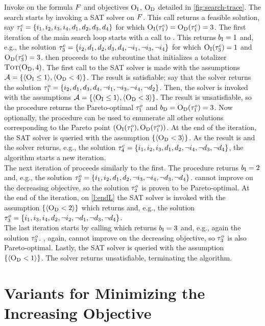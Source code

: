 \begin{example}\label{ex:main-iteration}
  Invoke \algname{} on the formula $F$ and objectives $\textsc{O}_{\text{I}}$, $\textsc{O}_{\text{D}}$ detailed in \cref{fig:search-trace}. 
  The search starts by invoking a SAT solver on $F$.
  This call returns a feasible solution, say $\tau^c_1 = \{i_1,\allowbreak i_2,\allowbreak i_3,\allowbreak i_4,\allowbreak d_1,\allowbreak d_2,\allowbreak d_3,\allowbreak d_4\}$ for which $\textsc{O}_{\text{I}}(\tau^c_1) = \textsc{O}_{\text{D}}(\tau^c_1) = 3$. 
  The first iteration of the main search loop starts with a call to \Min{}.
  This returns $b_{\text{I}} = 1$ and, e.g., the solution $\tau^c_3 = \{i_2,\allowbreak d_1,\allowbreak d_2,\allowbreak d_3,\allowbreak d_4,\allowbreak \lnot i_1,\allowbreak \lnot i_3,\allowbreak \lnot i_4\}$ for which $\textsc{O}_{\text{I}}(\tau^c_3) = 1$ and $\textsc{O}_{\text{D}}(\tau^c_3) = 3$.
  \algname{} then proceeds to the \Simpr{} subroutine that initializes a totalizer $\textsc{Tot}(\textsc{O}_{\text{D}}, 4)$.
  The first call to the SAT solver is made with the assumptions $\mathcal{A} = \{ \langle \textsc{O}_{\text{I}} \leq 1 \rangle, \langle \textsc{O}_{\text{D}} < 4 \rangle \}$.
  The result is satisfiable;
  say that the solver returns the solution $\tau^o_1 = \{i_2,\allowbreak d_1,\allowbreak d_3,\allowbreak d_4,\allowbreak \lnot i_1,\allowbreak \lnot i_3,\allowbreak \lnot i_4,\allowbreak \lnot d_2\}$.
  Then, the solver is invoked with the assumptions $\mathcal{A} =  \{ \langle \textsc{O}_{\text{I}} \leq 1 \rangle, \langle \textsc{O}_{\text{D}} < 3 \rangle \}$.
  The result is unsatisfiable, so the procedure returns the Pareto-optimal $\tau^o_1$ and $b_{\text{D}} = \textsc{O}_{\text{D}}(\tau^o_1) = 3$.
  Now optionally, the procedure \E{} can be used to enumerate all other solutions corresponding to the Pareto point $(\textsc{O}_{\text{I}}(\tau^o_1),\textsc{O}_{\text{D}}(\tau^o_1))$.
  At the end of the iteration, the SAT solver is queried with the assumption $\{ \langle \textsc{O}_{\text{D}} < 3 \rangle \}$.
  As the result is \sat{} and the solver returns, e.g., the solution $\tau^c_4 = \{i_1,\allowbreak i_2,\allowbreak i_3,\allowbreak d_1,\allowbreak d_2,\allowbreak \lnot i_4,\allowbreak \lnot d_3,\allowbreak \lnot d_4\}$,
  the algorithm starts a new iteration. \\
  The next iteration of \algname{} proceeds similarly to the first.
  The procedure \Min{} returns $b_{\text{I}} = 2$ and, e.g., the solution $\tau^o_2 = \{i_1,\allowbreak i_2,\allowbreak d_1,\allowbreak d_2,\allowbreak \lnot i_3,\allowbreak \lnot i_4,\allowbreak \lnot d_3,\allowbreak \lnot d_4\}$.
  \Simpr{} cannot improve on the decreasing objective, so the solution $\tau^o_2$ is proven to be Pareto-optimal.
  At the end of the iteration, on \cref{l:endL} the SAT solver is invoked with the assumption $\{\langle \textsc{O}_{\text{D}} < 2 \rangle\}$ which returns \sat{} and, e.g., the solution $\tau^o_3 = \{i_1,\allowbreak i_3,\allowbreak i_4,\allowbreak d_2,\allowbreak \lnot i_2,\allowbreak \lnot d_1,\allowbreak \lnot d_3,\allowbreak \lnot d_4\}$. \\
  The last iteration starts by calling \Min{} which returns $b_{\text{I}} = 3$ and, e.g., again the solution $\tau^o_3$.
  \Simpr{}, again, cannot improve on the decreasing objective, so $\tau^o_3$ is also Pareto-optimal.
  Lastly, the SAT solver is queried with the assumption $\{\langle \textsc{O}_{\text{D}} < 1 \rangle\}$.
  The solver returns unsatisfiable, terminating the algorithm. 
\end{example}

\section{Variants for Minimizing the Increasing Objective\label{sec:variants}}

